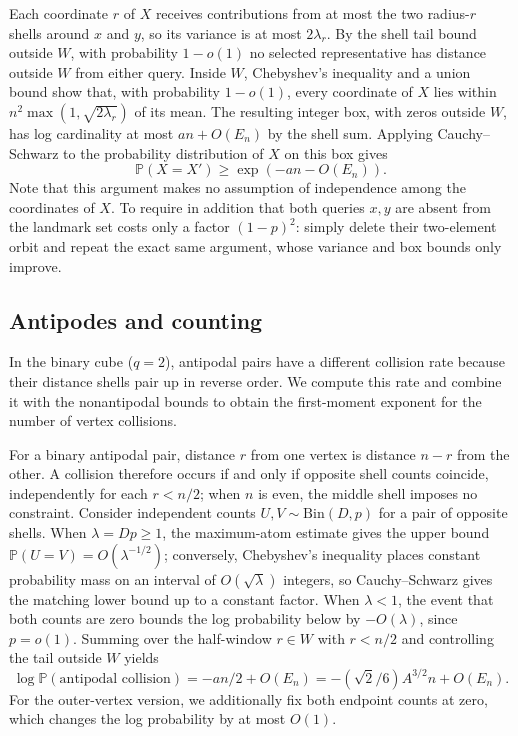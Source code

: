 Each coordinate $r$ of $X$ receives contributions from at most the two radius-$r$ shells around $x$ and $y$, so its variance is at most $2\lambda_r$. By the shell tail bound outside $W$, with probability $1-o(1)$ no selected representative has distance outside $W$ from either query. Inside $W$, Chebyshev's inequality and a union bound show that, with probability $1-o(1)$, every coordinate of $X$ lies within $n^2\max(1,\sqrt{2\lambda_r})$ of its mean. The resulting integer box, with zeros outside $W$, has log cardinality at most $an+O(E_n)$ by the shell sum. Applying Cauchy--Schwarz to the probability distribution of $X$ on this box gives
\[
 \mathbb P(X=X')\ge \exp(-an-O(E_n)).
\]
Note that this argument makes no assumption of independence among the coordinates of $X$. To require in addition that both queries $x,y$ are absent from the landmark set costs only a factor $(1-p)^2$: simply delete their two-element orbit and repeat the exact same argument, whose variance and box bounds only improve.

\subsection{Antipodes and counting}
In the binary cube ($q=2$), antipodal pairs have a different collision rate because their distance shells pair up in reverse order. We compute this rate and combine it with the nonantipodal bounds to obtain the first-moment exponent for the number of vertex collisions.

For a binary antipodal pair, distance $r$ from one vertex is distance $n-r$ from the other. A collision therefore occurs if and only if opposite shell counts coincide, independently for each $r<n/2$; when $n$ is even, the middle shell imposes no constraint. Consider independent counts $U,V\sim\mathrm{Bin}(D,p)$ for a pair of opposite shells. When $\lambda=Dp\ge1$, the maximum-atom estimate gives the upper bound $\mathbb P(U=V)=O(\lambda^{-1/2})$; conversely, Chebyshev's inequality places constant probability mass on an interval of $O(\sqrt\lambda)$ integers, so Cauchy--Schwarz gives the matching lower bound up to a constant factor. When $\lambda<1$, the event that both counts are zero bounds the log probability below by $-O(\lambda)$, since $p=o(1)$. Summing over the half-window $r\in W$ with $r<n/2$ and controlling the tail outside $W$ yields
\[
 \log\mathbb P(\text{antipodal collision})=-an/2+O(E_n)
 =-(\sqrt2/6)A^{3/2}n+O(E_n).
\]
For the outer-vertex version, we additionally fix both endpoint counts at zero, which changes the log probability by at most $O(1)$.

